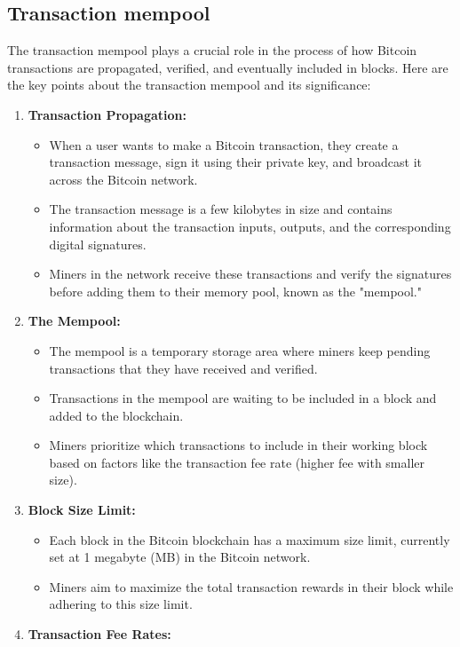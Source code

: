 \documentclass{report}
\begin{document}
\subsection{Transaction mempool}
The transaction mempool plays a crucial role in the process of how Bitcoin transactions are propagated, verified, and eventually included in blocks. Here are the key points about the transaction mempool and its significance:
\begin{enumerate}
	\item \textbf{Transaction Propagation:}
	\begin{itemize}
		\item When a user wants to make a Bitcoin transaction, they create a transaction message, sign it using their private key, and broadcast it across the Bitcoin network.
		\item The transaction message is a few kilobytes in size and contains information about the transaction inputs, outputs, and the corresponding digital signatures.
		\item Miners in the network receive these transactions and verify the signatures before adding them to their memory pool, known as the "mempool."
	\end{itemize}
	\item \textbf{The Mempool:}
	\begin{itemize}
		\item The mempool is a temporary storage area where miners keep pending transactions that they have received and verified.
		\item Transactions in the mempool are waiting to be included in a block and added to the blockchain.
		\item Miners prioritize which transactions to include in their working block based on factors like the transaction fee rate (higher fee with smaller size).
	\end{itemize}
	\item \textbf{Block Size Limit:}
	\begin{itemize}
		\item Each block in the Bitcoin blockchain has a maximum size limit, currently set at 1 megabyte (MB) in the Bitcoin network.
		\item Miners aim to maximize the total transaction rewards in their block while adhering to this size limit.
	\end{itemize}
	\item \textbf{Transaction Fee Rates:}
	\begin{itemize}

\end{itemize}
\end{enumerate}
\end{document}
